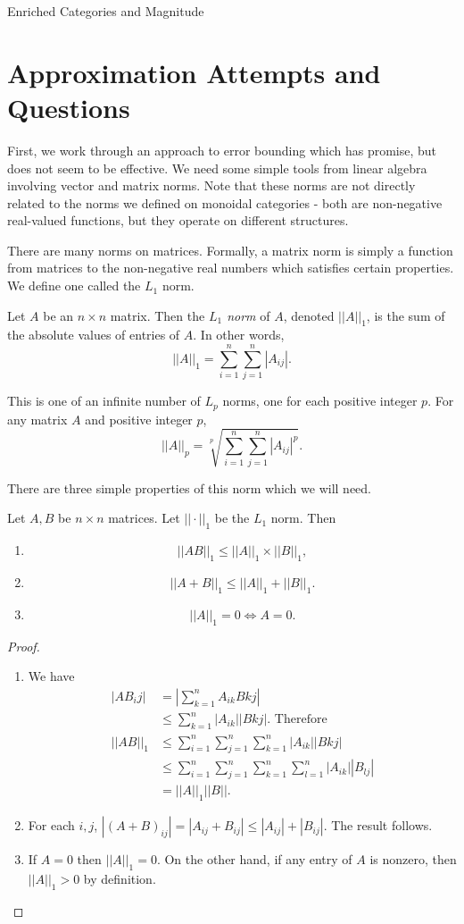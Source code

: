 \documentclass[12pt]{pom_thesis}
\begin{document}
\begin{chapter}{Enriched Categories and Magnitude}
\section{Approximation Attempts and Questions}
First, we work through an approach to error bounding which has promise, but does not seem to be effective. We need some simple tools from linear algebra involving vector and matrix norms. Note that these norms are not directly related to the norms we defined on monoidal categories - both are non-negative real-valued functions, but they operate on different structures.

There are many norms on matrices. Formally, a matrix norm is simply a function from matrices to the non-negative real numbers which satisfies certain properties.
We define one called the $L_1$ norm.
\begin{defn}
Let $A$ be an $n \times n$ matrix. Then the \emph{$L_1$ norm} of $A$, denoted $||A||_1$, is the sum of the absolute values of entries of $A$. In other words,
\[
||A||_1 = \sum_{i = 1}^n\sum_{j = 1}^n |A_{ij}|.
\]
\end{defn}
\begin{rmk}
This is one of an infinite number of $L_p$ norms, one for each positive integer $p$. For any matrix $A$ and positive integer $p$, 
\[
||A||_p = \sqrt[p]{\sum_{i = 1}^n\sum_{j = 1}^n |A_{ij}|^p}.
\]
\end{rmk}


There are three simple properties of this norm which we will need.
\begin{lemma}\label{lem:norm_prop}
Let $A, B$ be $n \times n$ matrices. Let $||\cdot||_1$ be the $L_1$ norm. Then
\begin{enumerate}
\item \[
||AB||_1 \leq ||A||_1\times ||B||_1,
\]

\item
\[
||A + B||_1 \leq ||A||_1 + ||B||_1.
\]
\item 
\[
||A||_1 = 0 \iff A = 0.
\]
\end{enumerate}
\end{lemma}
\begin{proof}
\begin{enumerate}
\item We have
\begin{align*}
|AB_ij| &= \left| \sum_{k = 1}^nA_{ik}B{kj}\right|\\
&\leq \sum_{k = 1}^n|A_{ik}||B{kj}|. \text{ Therefore}\\
||AB||_1 &\leq \sum_{i = 1}^n\sum_{j=1}^n\sum_{k=1}^n|A_{ik}||B{kj}|\\
&\leq \sum_{i = 1}^n\sum_{j=1}^n\sum_{k=1}^n\sum_{l=1}^n|A_{ik}||B_{lj}|\\
&= ||A||_1||B||.
\end{align*}
\item For each $i,j$, $|(A + B)_{ij}| = |A_{ij} + B_{ij}| \leq |A_{ij}| + |B_{ij}|$. The result follows.
\item If $A=0$ then $||A||_1=0$. On the other hand, if any entry of $A$ is nonzero, then $||A||_1 > 0$ by definition.
\end{enumerate}


\end{proof}
\end{chapter}
\end{document}
